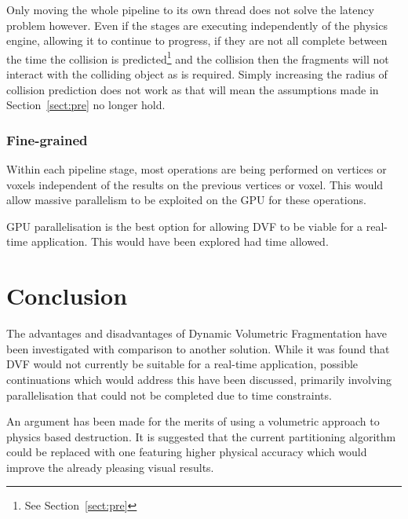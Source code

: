 Only moving the whole pipeline to its own thread does not solve the latency problem however. Even if the stages are executing independently of the physics engine, allowing it to continue to progress, if they are not all complete between the time the collision is predicted\footnote{See Section~\ref{sect:pre}} and the collision then the fragments will not interact with the colliding object as is required. Simply increasing the radius of collision prediction does not work as that will mean the assumptions made in Section~\ref{sect:pre} no longer hold.

\subsubsection{Fine-grained}

Within each pipeline stage, most operations are being performed on vertices or voxels independent of the results on the previous vertices or voxel. This would allow massive parallelism to be exploited on the GPU for these operations.

GPU parallelisation is the best option for allowing DVF to be viable for a real-time application. This would have been explored had time allowed.

\section{Conclusion}

The advantages and disadvantages of Dynamic Volumetric Fragmentation have been investigated with comparison to another solution. While it was found that DVF would not currently be suitable for a real-time application, possible continuations which would address this have been discussed, primarily involving parallelisation that could not be completed due to time constraints.

An argument has been made for the merits of using a volumetric approach to physics based destruction. It is suggested that the current partitioning algorithm could be replaced with one featuring higher physical accuracy which would improve the already pleasing visual results.